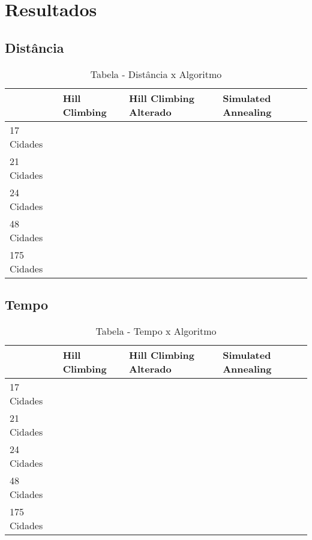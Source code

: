 \documentclass[12pt, a4paper]{article}
\begin{document}
\section{Resultados}
	\subsection{Distância}
		\begin{table}[h]
			\centering
			\label{my-label}
				\begin{tabular}{llll}
				            & Hill Climbing & Hill Climbing Alterado & Simulated Annealing \\ \hline
				17 Cidades  &               &                        &                     \\ \hline
				21 Cidades  &               &                        &                     \\ \hline
				24 Cidades  &               &                        &                     \\ \hline
				48 Cidades  &               &                        &                     \\ \hline
				175 Cidades &               &                        &                    
				\end{tabular}
				\caption{Tabela - Distância x Algoritmo}
		\end{table}

	\subsection{Tempo}
		\begin{table}[h]
			\centering
			\label{my-label}
				\begin{tabular}{llll}
				            & Hill Climbing & Hill Climbing Alterado & Simulated Annealing \\ \hline
				17 Cidades  &               &                        &                     \\ \hline
				21 Cidades  &               &                        &                     \\ \hline
				24 Cidades  &               &                        &                     \\ \hline
				48 Cidades  &               &                        &                     \\ \hline
				175 Cidades &               &                        &                    
				\end{tabular}
				\caption{Tabela - Tempo x Algoritmo}
		\end{table}
\end{document}
